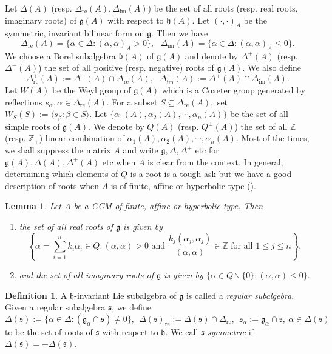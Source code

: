 \documentclass[12pt,reqno]{amsart}
\theoremstyle{plain}
\newtheorem{lem}{Lemma}
\theoremstyle{definition}
\newtheorem{defn}{Definition}
\theoremstyle{remark}
\newcommand{\lie}[1]{\mathfrak{#1}}
\newcommand\bz{\mathbb Z}
\begin{document}
Let $\Delta(A)$ (resp. $\Delta_{\mathrm{re}}(A), \Delta_{\mathrm{im}}(A)$) be the set of all roots (resp. real roots, imaginary roots) of $\lie g(A)$ with respect to $\lie h(A).$ Let $(\cdot,\cdot)_{A}$ be the symmetric, invariant bilinear form on $\lie g.$ Then we have $$\Delta_{\mathrm{re}}(A)=\{\alpha\in\Delta:(\alpha,\alpha)_A>0\},\ \ \ \Delta_{\mathrm{im}}(A)=\{\alpha\in\Delta:(\alpha,\alpha)_A\le 0\}.$$ We choose a Borel subalgebra $\lie b(A)$ of $\lie g(A)$ and denote by $\Delta^+(A)$ (resp. $\Delta^-(A)$) the set of all positive (resp. negative) roots of $\lie g(A).$ We also define $$\Delta_{\mathrm{re}}^{\pm}(A):=\Delta^{\pm}(A)\cap \Delta_{\mathrm{re}}(A),\ \ \ \Delta_{\mathrm{im}}^{\pm}(A):=\Delta^{\pm}(A)\cap \Delta_{\mathrm{im}}(A).$$
Let $W(A)$ be the Weyl group of $\lie g(A)$ which is a Coxeter group generated by reflections $s_\alpha,\alpha\in\Delta_{\mathrm{re}}(A).$ For a subset $S\subseteq\Delta_{\mathrm{re}}(A),$ set $W_S(S):=\langle s_\beta:\beta\in S \rangle.$
Let $\{\alpha_1(A),\alpha_2(A),\cdots,\alpha_n(A)\}$ be the set of all simple roots of $\lie g(A).$ We denote by $Q(A)$ (resp. $Q^\pm(A)$) the set of all $\bz$ (resp. $\bz_{\pm}$) linear combination of $\alpha_1(A),\alpha_2(A),\cdots,\alpha_n(A).$ Most of the times, we shall suppress the matrix $A$ and write $\lie g,\Delta,\Delta^+$ etc for $\lie g(A),\Delta(A),\Delta^+(A)$ etc when $A$ is clear from the context. In general, determining which elements of $Q$ is a root is a tough ask but we have a good description of roots when $A$ is of finite, affine or hyperbolic type (\cite[Proposition 5.10]{kac1990infinite}).
\begin{lem}\label{keylem}
    Let $A$ be a GCM of finite, affine or hyperbolic type. Then 
    \begin{enumerate}
        \item the set of all real roots of $\lie g$ is given by $$\left\{\alpha=\sum_{i=1}^n k_i \alpha_i\in Q:(\alpha,\alpha)>0\text{ and } \frac{k_j(\alpha_j,\alpha_j)}{(\alpha,\alpha)}\in \bz\text{ for all }1\le j\le n\right\},$$
        \item and the set of all imaginary roots of $\lie g$ is given by 
        $\{\alpha\in Q\backslash \{0\}: (\alpha,\alpha)\le 0\}.$
    \end{enumerate}
\end{lem}
\begin{defn}
    A $\lie h$-invariant Lie subalgebra of $\lie{g}$ is called a \textit{regular subalgebra}. Given a regular subalgebra $\lie{s}$, we define
$$\Delta(\lie{s}):=\{\alpha\in\Delta:(\lie{g}_{\alpha}\cap \lie s)\neq 0\},\ \ \Delta(\lie{s})_{\mathrm{re}}:=\Delta(\lie{s})\cap\Delta_{\mathrm{re}},\ \ \lie{s}_{\alpha}:=\lie{g}_\alpha\cap \lie{s},\ \alpha\in\Delta(\lie s)$$ to be the set of roots of $\lie s$ with respect to $\lie h$.  We call $\lie s$ \textit{symmetric} if $\Delta(\lie{s})=-\Delta(\lie{s})$.
\end{defn}
\end{document}
